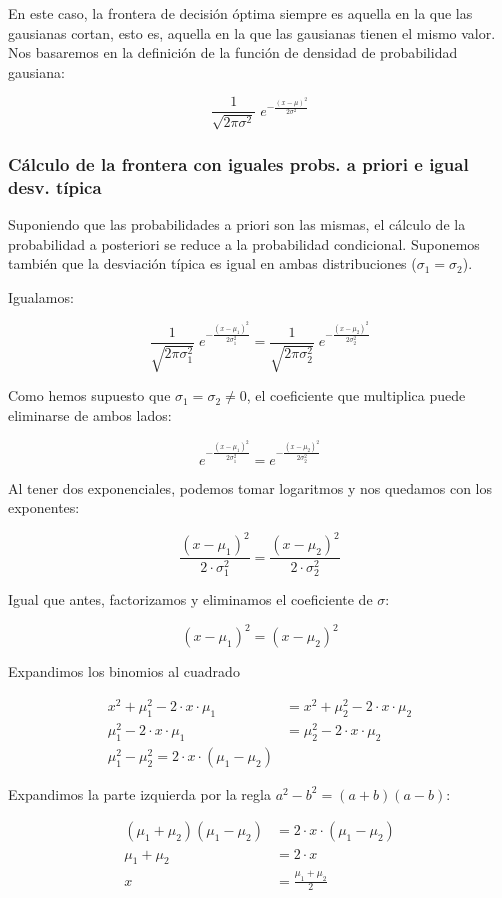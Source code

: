 \documentclass[11pt]{scrartcl}
\begin{document}
En este caso, la frontera de decisión óptima siempre es aquella en la que las
gausianas cortan, esto es, aquella en la que las gausianas tienen el mismo
valor. Nos basaremos en la definición de la función de densidad de probabilidad gausiana:

\[
\frac{1}{\sqrt{2\pi\sigma^2}}\; e^{ - \frac{(x-\mu)^2}{2 \sigma^2}}
\]

\subsubsection{Cálculo de la frontera con iguales probs. a priori e igual desv. típica}

Suponiendo que las probabilidades a priori son las mismas, el cálculo de la
probabilidad a posteriori se reduce a la probabilidad condicional. Suponemos
también que la desviación típica es igual en ambas distribuciones ($\sigma_1 =
\sigma_2$).

Igualamos:

\[
\frac{1}{\sqrt{2\pi\sigma_1^2}}\; e^{- \frac{(x-\mu_1)^2}{2 \sigma_1^2}} = \frac{1}{\sqrt{2\pi\sigma_2^2}}\; e^{- \frac{(x-\mu_2)^2}{2 \sigma_2^2}}
\]

Como hemos supuesto que $\sigma_1 = \sigma_2 \ne 0$, el coeficiente que
multiplica puede eliminarse de ambos lados:

\[
e^{- \frac{(x-\mu_1)^2}{2 \sigma_1^2}} = e^{- \frac{(x-\mu_2)^2}{2 \sigma_2^2}}
\]

Al tener dos exponenciales, podemos tomar logaritmos y nos quedamos con los
exponentes:

\[
\frac{(x-\mu_1)^2}{2 \cdot \sigma_1^2} = \frac{(x-\mu_2)^2}{2 \cdot \sigma_2^2} 
\]

Igual que antes, factorizamos y eliminamos el coeficiente de $\sigma$:

\[
(x - \mu_1)^2 = (x - \mu_2)^2
\]

Expandimos los binomios al cuadrado

\begin{align*}
x^2 + \mu_1^2 - 2 \cdot x \cdot \mu_1 &= x^2 + \mu_2^2 - 2 \cdot x \cdot \mu_2 \\
\mu_1^2 - 2 \cdot x \cdot \mu_1 &= \mu_2^2 - 2 \cdot x \cdot \mu_2 \\
\mu_1^2 - \mu_2^2 = 2 \cdot x \cdot (\mu_1 - \mu_2)
\end{align*}

Expandimos la parte izquierda por la regla $a^2 - b^2 = (a+b)(a-b)$:

\begin{align*}
(\mu_1 + \mu_2)(\mu_1 - \mu_2) &= 2 \cdot x \cdot (\mu_1 - \mu_2) \\
\mu_1 + \mu_2 &= 2 \cdot x \\
x &= \frac{\mu_1 + \mu_2}{2}
\end{align*}
\end{document}
